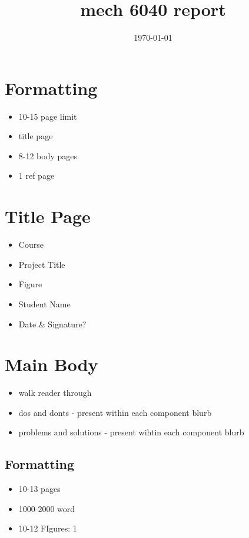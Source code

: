 \documentclass[11pt]{article}
\date{\today}
\title{mech 6040 report}
\begin{document}
\maketitle
\tableofcontents


\section{Formatting}
\label{sec:org0fdc752}
\begin{itemize}
\item 10-15 page limit
\item title page
\item 8-12 body pages
\item 1 ref page
\end{itemize}

\section{Title Page}
\label{sec:org9a132c6}
\begin{itemize}
\item Course
\item Project Title
\item Figure
\item Student Name
\item Date \& Signature?
\end{itemize}

\section{Main Body}
\label{sec:org818f31c}
\begin{itemize}
\item walk reader through
\item dos and donts - present within each component blurb
\item problems and solutions - present wihtin each component blurb
\end{itemize}

\subsection{Formatting}
\label{sec:org3a257dc}
\begin{itemize}
\item 10-13 pages
\item 1000-2000 word
\item 10-12 FIgures: 1
\end{itemize}
\end{document}
